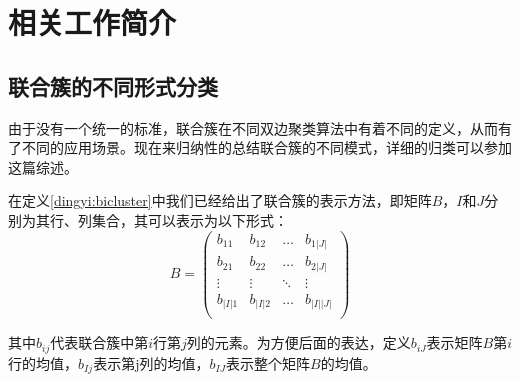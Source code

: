 
\chapter{相关工作简介}
\label{chapter:rw}

\section{联合簇的不同形式分类}
\label{sec:bicluster}
由于没有一个统一的标准，联合簇在不同双边聚类算法中有着不同的定义，从而有了不同的应用场景。现在来归纳性的总结联合簇的不同模式，详细的归类可以参加这篇综述\cite{pontes2015biclustering}。

在定义\ref{dingyi:bicluster}中我们已经给出了联合簇的表示方法，即矩阵$B$，$I$和$J$分别为其行、列集合，其可以表示为以下形式：
\begin{equation*}
  B = \left(
    \begin{array}{cccc}
      b_{11} & b_{12} & \ldots & b_{1|J|} \\
      b_{21} & b_{22} & \ldots & b_{2|J|} \\
      \vdots & \vdots & \ddots & \vdots \\
      b_{|I|1} & b_{|I|2} & \ldots & b_{|I||J|} \\
    \end{array}
  \right)
\end{equation*}
\vspace{1mm}

其中$b_{ij}$代表联合簇中第$i$行第$j$列的元素。为方便后面的表达，定义$b_{iJ}$表示矩阵$B$第$i$行的均值，$b_{Ij}$表示第j列的均值，$b_{IJ}$表示整个矩阵$B$的均值。

